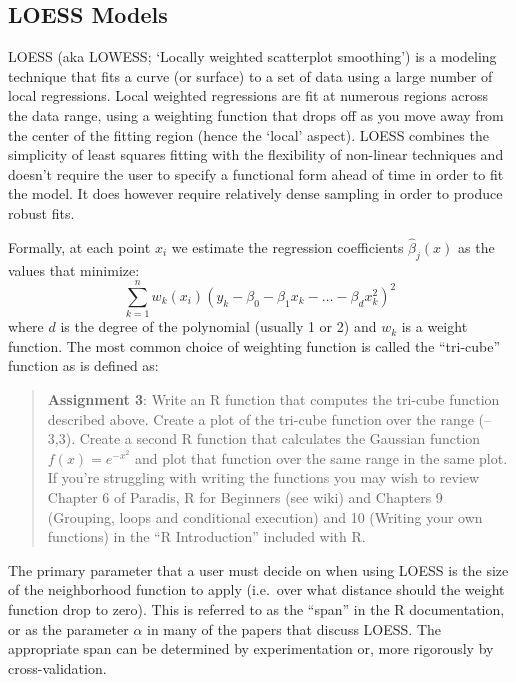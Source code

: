 \subsection{LOESS Models}

LOESS (aka LOWESS; `Locally weighted scatterplot smoothing') is a
modeling technique that fits a curve (or surface) to a set of data using
a large number of local regressions. Local weighted regressions are fit
at numerous regions across the data range, using a weighting function
that drops off as you move away from the center of the fitting region
(hence the `local' aspect). LOESS combines the simplicity of least
squares fitting with the flexibility of non-linear techniques and
doesn't require the user to specify a functional form ahead of time in
order to fit the model. It does however require relatively dense
sampling in order to produce robust fits.

Formally, at each point $x_i$ we estimate the regression coefficients
$\hat{\beta}_j(x)$ as the values that minimize:
\[\sum_{k=1}^n w_k(x_i)(y_k - \beta_0 - \beta_1 x_k - \ldots - \beta_d x_k^2)^2\]
where $d$ is the degree of the polynomial (usually 1 or 2) and $w_k$ is
a weight function. The most common choice of weighting function is
called the ``tri-cube'' function as is defined as:



\begin{quote}
\textbf{Assignment 3}: Write an R function that computes the tri-cube
function described above. Create a plot of the tri-cube function over
the range (--3,3). Create a second R function that calculates the
Gaussian function $f(x) = e^{-x^2}$ and plot that function over the same
range in the same plot. If you're struggling with writing the functions
you may wish to review Chapter 6 of Paradis, R for Beginners (see wiki)
and Chapters 9 (Grouping, loops and conditional execution) and 10
(Writing your own functions) in the ``R Introduction'' included with R.

\end{quote}
The primary parameter that a user must decide on when using LOESS is the
size of the neighborhood function to apply (i.e.~over what distance
should the weight function drop to zero). This is referred to as the
``span'' in the R documentation, or as the parameter $\alpha$ in many of
the papers that discuss LOESS. The appropriate span can be determined by
experimentation or, more rigorously by cross-validation.

